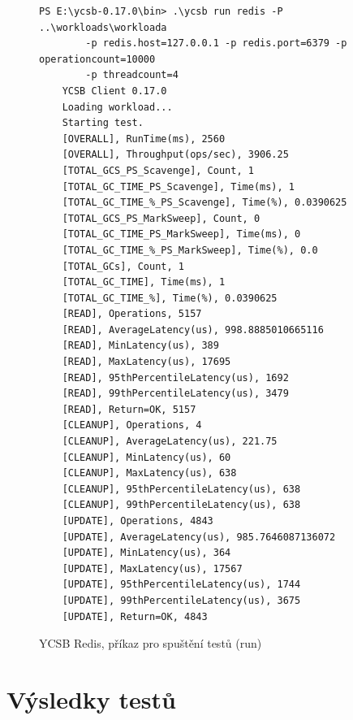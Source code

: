 \documentclass[czech,master,dept460,male,csharp,cpdeclaration]{diploma}
\begin{document}
	\begin{figure}
	\centering
	\begin{lstlisting}[style=DOS]
	PS E:\ycsb-0.17.0\bin> .\ycsb run redis -P ..\workloads\workloada
		-p redis.host=127.0.0.1 -p redis.port=6379 -p operationcount=10000
		-p threadcount=4
	YCSB Client 0.17.0
	Loading workload...
	Starting test.
	[OVERALL], RunTime(ms), 2560
	[OVERALL], Throughput(ops/sec), 3906.25
	[TOTAL_GCS_PS_Scavenge], Count, 1
	[TOTAL_GC_TIME_PS_Scavenge], Time(ms), 1
	[TOTAL_GC_TIME_%_PS_Scavenge], Time(%), 0.0390625
	[TOTAL_GCS_PS_MarkSweep], Count, 0
	[TOTAL_GC_TIME_PS_MarkSweep], Time(ms), 0
	[TOTAL_GC_TIME_%_PS_MarkSweep], Time(%), 0.0
	[TOTAL_GCs], Count, 1
	[TOTAL_GC_TIME], Time(ms), 1
	[TOTAL_GC_TIME_%], Time(%), 0.0390625
	[READ], Operations, 5157
	[READ], AverageLatency(us), 998.8885010665116
	[READ], MinLatency(us), 389
	[READ], MaxLatency(us), 17695
	[READ], 95thPercentileLatency(us), 1692
	[READ], 99thPercentileLatency(us), 3479
	[READ], Return=OK, 5157
	[CLEANUP], Operations, 4
	[CLEANUP], AverageLatency(us), 221.75
	[CLEANUP], MinLatency(us), 60
	[CLEANUP], MaxLatency(us), 638
	[CLEANUP], 95thPercentileLatency(us), 638
	[CLEANUP], 99thPercentileLatency(us), 638
	[UPDATE], Operations, 4843
	[UPDATE], AverageLatency(us), 985.7646087136072
	[UPDATE], MinLatency(us), 364
	[UPDATE], MaxLatency(us), 17567
	[UPDATE], 95thPercentileLatency(us), 1744
	[UPDATE], 99thPercentileLatency(us), 3675
	[UPDATE], Return=OK, 4843
	\end{lstlisting}
	\caption{YCSB Redis, příkaz pro spuštění testů (run)
	\label{ps-ycsb-run}}
	\end{figure}

	\section{Výsledky testů}
	
\end{document}
